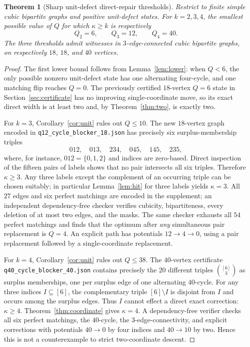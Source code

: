 \documentclass[11pt]{article}
\newtheorem{theorem}{Theorem}[section]
\begin{document}
\begin{theorem}[Sharp unit-defect direct-repair thresholds]
\label{thm:sharp-hierarchy}
Restrict to finite simple cubic bipartite graphs and positive
unit-defect states. For $k=2,3,4$, the smallest possible value of
$Q$ for which $\kappa\ge k$ is respectively
\[
\boxed{\quad Q_2=6,\qquad Q_3=12,\qquad Q_4=40.\quad}
\]
The three thresholds admit witnesses in \emph{$3$-edge-connected}
cubic bipartite graphs, on respectively $18$, $18$, and $40$
vertices.
\end{theorem}
\begin{proof}
The first lower bound follows from Lemma~\ref{lem:lower}:
when $Q<6$, the only possible nonzero unit-defect state has one
alternating four-cycle, and one matching flip reaches $Q=0$.
The previously certified $18$-vertex $Q=6$ state in
Section~\ref{sec:certificate} has no improving single-coordinate
move, so its exact direct width is at least two and, by
Theorem~\ref{thm:two}, is exactly two.

For $k=3$, Corollary~\ref{cor:unit} rules out $Q\le10$.
The new $18$-vertex graph encoded in
\nolinkurl{q12_cycle_blocker_18.json} has precisely six
surplus-membership triples
\[
 012,\quad013,\quad234,\quad045,\quad145,\quad235,
\]
where, for instance, $012=\{0,1,2\}$ and indices are
zero-based. Direct inspection of the fifteen pairs of labels
shows that no pair intersects all six triples. Therefore
$\kappa\ge3$. Any three labels except the complement of
an occurring triple can be chosen suitably; in particular
Lemma~\ref{lem:hit} for three labels yields $\kappa=3$.
All $27$ edges and six perfect matchings are encoded in the
supplement; an independent dependency-free checker verifies cubicity,
bipartiteness, every deletion of at most two edges, and the masks.
The same checker exhausts all $54$ perfect matchings and finds that
the optimum after \emph{any} simultaneous pair replacement is $Q=4$.
An explicit path has potentials $12\to4\to0$, using a pair
replacement followed by a single-coordinate replacement.

For $k=4$, Corollary~\ref{cor:unit} rules out $Q\le38$.
The $40$-vertex certificate
\nolinkurl{q40_cycle_blocker_40.json} contains precisely the
$20$ different triples $\binom{[6]}3$ as surplus memberships,
one per surplus edge of one alternating $40$-cycle. For any
three indices $I\subseteq[6]$, the complementary triple
$[6]\setminus I$ is disjoint from $I$ and occurs among the
surplus edges. Thus $I$ cannot effect a direct exact correction:
$\kappa\ge4$. Theorem~\ref{thm:coordinate} gives $\kappa=4$.
A dependency-free verifier checks all six perfect matchings, the
$40$-cycle, the $3$-edge-connectivity, and explicit corrections
with potentials $40\to0$ by four indices and $40\to10$ by two.
Hence this is not a counterexample to strict two-coordinate descent.
\end{proof}
\end{document}

